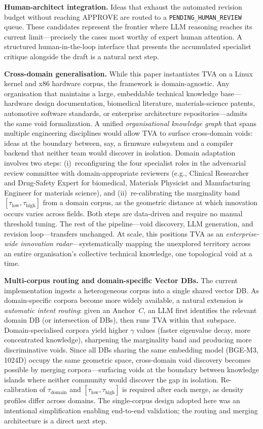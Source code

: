 \documentclass[11pt,twocolumn]{article}
\newcommand{\taudomain}{\tau_{\mathrm{domain}}}
\newcommand{\taulow}{\tau_{\mathrm{low}}}
\newcommand{\tauhigh}{\tau_{\mathrm{high}}}
\begin{document}
\textbf{Human-architect integration.}
Ideas that exhaust the automated revision budget without reaching
APPROVE are routed to a \texttt{PENDING\_HUMAN\_REVIEW} queue.
These candidates represent the frontier where LLM reasoning reaches
its current limit---precisely the cases most worthy of expert
human attention.  A structured human-in-the-loop interface that
presents the accumulated specialist critique alongside the draft
is a natural next step.

\textbf{Cross-domain generalisation.}
While this paper instantiates TVA on a Linux kernel and x86
hardware corpus, the framework is domain-agnostic.  Any
organisation that maintains a large, embeddable technical knowledge
base---hardware design documentation, biomedical literature,
materials-science patents, automotive software standards, or
enterprise architecture repositories---admits the same void
formalization.  A unified \emph{organisational knowledge graph}
that spans multiple engineering disciplines would allow TVA to
surface cross-domain voids: ideas at the boundary between, say,
a firmware subsystem and a compiler backend that neither team would
discover in isolation.  Domain adaptation involves two steps: (i)~reconfiguring the four
specialist roles in the adversarial review committee with
domain-appropriate reviewers (e.g., Clinical Researcher and
Drug-Safety Expert for biomedical, Materials Physicist and
Manufacturing Engineer for materials science), and
(ii)~re-calibrating the marginality band $[\taulow, \tauhigh]$
from a domain corpus, as the geometric distance at which innovation
occurs varies across fields.  Both steps are data-driven and require
no manual threshold tuning.  The rest of the pipeline---void
discovery, LLM generation, and revision loop---transfers unchanged.
At scale, this positions TVA as an
\emph{enterprise-wide innovation radar}---systematically mapping
the unexplored territory across an entire organisation's collective
technical knowledge, one topological void at a time.

\textbf{Multi-corpus routing and domain-specific Vector DBs.}
The current implementation ingests a heterogeneous corpus into a single
shared vector DB\@.  As domain-specific corpora become more widely
available, a natural extension is \emph{automatic intent routing}: given
an Anchor~$C$, an LLM first identifies the relevant domain DB (or
intersection of DBs), then runs TVA within that subspace.
Domain-specialised corpora yield higher $\gamma$ values (faster
eigenvalue decay, more concentrated knowledge), sharpening the
marginality band and producing more discriminative voids.  Since all
DBs sharing the same embedding model (BGE-M3, 1024D) occupy the same
geometric space, cross-domain void discovery becomes possible by merging
corpora---surfacing voids at the boundary between knowledge islands
where neither community would discover the gap in isolation.
Re-calibration of $\taudomain$ and $[\taulow, \tauhigh]$ is required
after each merge, as density profiles differ across domains.  The
single-corpus design adopted here was an intentional simplification
enabling end-to-end validation; the routing and merging architecture
is a direct next step.
\end{document}
